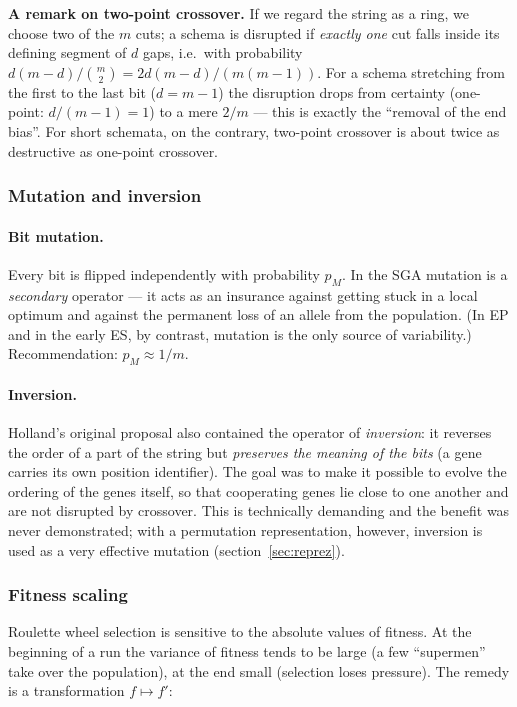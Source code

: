 \documentclass[11pt,a4paper]{article}
\theoremstyle{definition}
\providecommand{\uv}[1]{``#1''}
\begin{document}
\textbf{A remark on two-point crossover.} If we regard the string as a ring, we
choose two of the $m$ cuts; a schema is disrupted if \emph{exactly one} cut
falls inside its defining segment of $d$ gaps, i.e.\ with probability
$d(m-d)/\binom{m}{2} = 2d(m-d)/(m(m-1))$. For a schema stretching from the first
to the last bit ($d = m-1$) the disruption drops from certainty (one-point:
$d/(m-1) = 1$) to a mere $2/m$ --- this is exactly the \uv{removal of the end
bias}. For short schemata, on the contrary, two-point crossover is about twice
as destructive as one-point crossover.

\subsubsection{Mutation and inversion}

\paragraph{Bit mutation.} Every bit is flipped independently with probability
$p_M$. In the SGA mutation is a \emph{secondary} operator --- it acts as an
insurance against getting stuck in a local optimum and against the permanent
loss of an allele from the population. (In EP and in the early ES, by contrast,
mutation is the only source of variability.) Recommendation:
$p_M \approx 1/m$.

\paragraph{Inversion.} Holland's original proposal also contained the operator
of \emph{inversion}: it reverses the order of a part of the string but
\emph{preserves the meaning of the bits} (a gene carries its own position
identifier). The goal was to make it possible to evolve the ordering of the
genes itself, so that cooperating genes lie close to one another and are not
disrupted by crossover. This is technically demanding and the benefit was never
demonstrated; with a permutation representation, however, inversion is used as a
very effective mutation (section~\ref{sec:reprez}).

\subsubsection{Fitness scaling}\label{ssec:skalovani}

Roulette wheel selection is sensitive to the absolute values of fitness. At the
beginning of a run the variance of fitness tends to be large (a few
\uv{supermen} take over the population), at the end small (selection loses
pressure). The remedy is a transformation $f \mapsto f'$:
\end{document}
